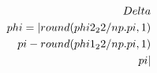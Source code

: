 \documentclass[preview]{standalone}
\begin{document}
\begin{align*}
\special{dvisvgm:raw <g id='unique000'>}\\Delta\\phi = |{round(phi2_22/np.pi, 1)}\\pi - {round(phi1_22/np.pi, 1)}\\pi|\special{dvisvgm:raw </g>}
\end{align*}
\end{document}
